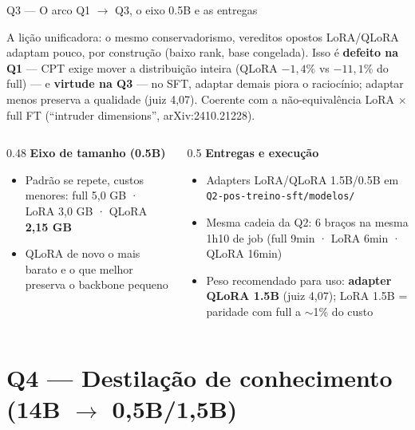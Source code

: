 \documentclass[10pt,aspectratio=169]{beamer}
\newcommand{\ganho}[1]{\textcolor{okgreen}{\textbf{#1}}}
\newcommand{\ruim}[1]{\textcolor{warnred}{\textbf{#1}}}
\begin{document}
\begin{frame}{Q3 — O arco Q1 $\to$ Q3, o eixo 0.5B e as entregas}
  \begin{block}{A lição unificadora: o mesmo conservadorismo, vereditos opostos}
    \small LoRA/QLoRA adaptam pouco, por construção (baixo rank, base congelada). Isso é
    \ruim{defeito na Q1} — CPT exige mover a distribuição inteira (QLoRA $-1{,}4\%$ vs $-11{,}1\%$
    do full) — e \ganho{virtude na Q3} — no SFT, adaptar demais piora o raciocínio; adaptar menos
    preserva a qualidade (juiz 4,07). Coerente com a não-equivalência LoRA $\times$ full FT
    (``intruder dimensions'', arXiv:2410.21228).
  \end{block}
  \begin{columns}[T]
    \begin{column}{0.48\textwidth}
      \textbf{Eixo de tamanho (0.5B)}
      \begin{itemize}\small
        \item Padrão se repete, custos menores: full 5,0 GB · LoRA 3,0 GB · QLoRA \textbf{2,15 GB}
        \item QLoRA de novo o mais barato e o que melhor preserva o backbone pequeno
      \end{itemize}
    \end{column}
    \begin{column}{0.5\textwidth}
      \textbf{Entregas e execução}
      \begin{itemize}\small
        \item Adapters LoRA/QLoRA 1.5B/0.5B em \texttt{Q2-pos-treino-sft/modelos/}
        \item Mesma cadeia da Q2: 6 braços na mesma 1h10 de job (full 9min · LoRA 6min · QLoRA 16min)
        \item Peso recomendado para uso: \textbf{adapter QLoRA 1.5B} (juiz 4,07); LoRA 1.5B = paridade com full a $\sim$1\% do custo
      \end{itemize}
    \end{column}
  \end{columns}
\end{frame}

\section{Q4 — Destilação de conhecimento (14B $\to$ 0,5B/1,5B)}
\end{document}
